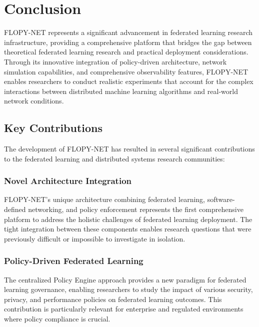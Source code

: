 \section{Conclusion}
\label{sec:conclusion}

FLOPY-NET represents a significant advancement in federated learning research infrastructure, providing a comprehensive platform that bridges the gap between theoretical federated learning research and practical deployment considerations. Through its innovative integration of policy-driven architecture, network simulation capabilities, and comprehensive observability features, FLOPY-NET enables researchers to conduct realistic experiments that account for the complex interactions between distributed machine learning algorithms and real-world network conditions.

\subsection{Key Contributions}

The development of FLOPY-NET has resulted in several significant contributions to the federated learning and distributed systems research communities:

\subsubsection{Novel Architecture Integration}

FLOPY-NET's unique architecture combining federated learning, software-defined networking, and policy enforcement represents the first comprehensive platform to address the holistic challenges of federated learning deployment. The tight integration between these components enables research questions that were previously difficult or impossible to investigate in isolation.

\subsubsection{Policy-Driven Federated Learning}

The centralized Policy Engine approach provides a new paradigm for federated learning governance, enabling researchers to study the impact of various security, privacy, and performance policies on federated learning outcomes. This contribution is particularly relevant for enterprise and regulated environments where policy compliance is crucial.

